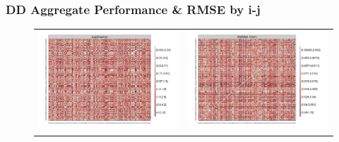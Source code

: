 \documentclass[10pt, compress]{beamer}
\begin{document}
\frame
{
\frametitle{DD Aggregate Performance \& RMSE by i-j}
  
  \begin{figure}[ht]
  \centering
    \begin{tabular}{cc}
      \hspace*{-.63in}
      \includegraphics[width=.6\textwidth]{dyadexpiperf.pdf} & 
      \includegraphics[width=.6\textwidth]{dyadmconfiperf.pdf}
    \end{tabular}
  \end{figure}
}

\end{document}
